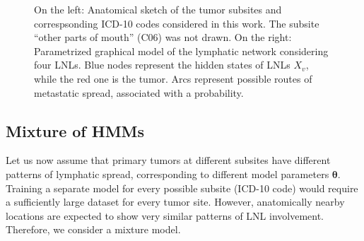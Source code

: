 \documentclass[11pt,twocolumn,twoside]{article}
\begin{document}
\begin{figure}[th]


\caption{\label{fig-schematic-and-graph}On the left: Anatomical sketch
of the tumor subsites and correspsonding ICD-10 codes considered in this
work. The subsite ``other parts of mouth'' (C06) was not drawn. On the
right: Parametrized graphical model of the lymphatic network considering
four LNLs. Blue nodes represent the hidden states of LNLs \(X_v\), while
the red one is the tumor. Arcs represent possible routes of metastatic
spread, associated with a probability.}

\end{figure}%

\subsection{Mixture of HMMs}\label{sec-mixture-of-hmms}

Let us now assume that primary tumors at different subsites have
different patterns of lymphatic spread, corresponding to different model
parameters \(\boldsymbol{\theta}\). Training a separate model for every
possible subsite (ICD-10 code) would require a sufficiently large
dataset for every tumor site. However, anatomically nearby locations are
expected to show very similar patterns of LNL involvement. Therefore, we
consider a mixture model.
\end{document}
